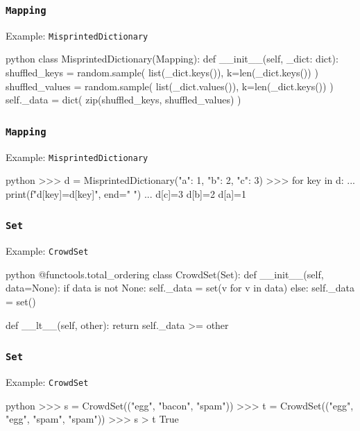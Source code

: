 \documentclass[aspectratio=169,dvipdfmx,12pt,notheorems]{beamer}
\theoremstyle{definition}
\begin{document}
\begin{frame}[fragile]\frametitle{\texttt{Mapping}}

\begin{exampleblock}{Example: \texttt{MisprintedDictionary}}
\begin{pygments}{python}
class MisprintedDictionary(Mapping):
    def __init__(self, _dict: dict):
        shuffled_keys = random.sample(
            list(_dict.keys()), k=len(_dict.keys())
        )
        shuffled_values = random.sample(
            list(_dict.values()), k=len(_dict.keys())
        )
        self._data = dict(
            zip(shuffled_keys, shuffled_values)
        )
\end{pygments}
\end{exampleblock}

\end{frame}

\begin{frame}[fragile]\frametitle{\texttt{Mapping}}

\begin{exampleblock}{Example: \texttt{MisprintedDictionary}}
\begin{pygments}{python}
>>> d = MisprintedDictionary({"a": 1, "b": 2, "c": 3})
>>> for key in d:
...     print(f"d[{key}]={d[key]}", end=" ")
...
d[c]=3 d[b]=2 d[a]=1
\end{pygments}
\end{exampleblock}

\end{frame}

\begin{frame}[fragile]\frametitle{\texttt{Set}}

\begin{exampleblock}{Example: \texttt{CrowdSet}}
\begin{pygments}{python}
@functools.total_ordering
class CrowdSet(Set):
    def __init__(self, data=None):
        if data is not None:
            self._data = set(v for v in data)
        else:
            self._data = set()

    def __lt__(self, other):
        return self._data >= other
\end{pygments}
\end{exampleblock}

\end{frame}

\begin{frame}[fragile]\frametitle{\texttt{Set}}

\begin{exampleblock}{Example: \texttt{CrowdSet}}
\begin{pygments}{python}
>>> s = CrowdSet(("egg", "bacon", "spam"))
>>> t = CrowdSet(("egg", "egg", "spam", "spam"))
>>> s > t
True
\end{pygments}
\end{exampleblock}

\end{frame}
\end{document}
